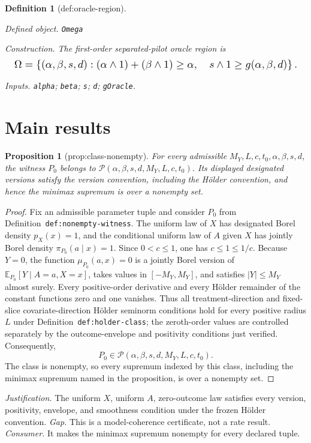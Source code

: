 \documentclass{article}
\newtheorem{definition}{Definition}
\newtheorem{proposition}{Proposition}
\begin{document}
\begin{definition}[def:oracle-region]\label{def:oracle-region}
\par\smallskip\noindent\emph{Defined object.} \texttt{Omega}
\par\smallskip\noindent\emph{Construction.} The first-order separated-pilot oracle region is
\[
\makebox[\linewidth][c]{\resizebox{0.98\linewidth}{!}{\(\displaystyle \Omega
=
\left\{(\alpha,\beta,s,d):
(\alpha\wedge1)+(\beta\wedge1)\ge\alpha,
\quad s\wedge1\ge g(\alpha,\beta,d)
\right\}.\)}}
\]
\par\smallskip\noindent\emph{Inputs.} \texttt{alpha}; \texttt{beta}; \texttt{s}; \texttt{d}; \texttt{gOracle}.
\end{definition}

\section{Main results}

\begin{proposition}[prop:class-nonempty]\label{prop:class-nonempty}
For every admissible \(M_Y,L,c,t_0,\alpha,\beta,s,d\), the witness \(P_0\) belongs to \(\mathcal P(\alpha,\beta,s,d,M_Y,L,c,t_0)\). Its displayed designated versions satisfy the version convention, including the Hölder convention, and hence the minimax supremum is over a nonempty set.
\end{proposition}
\begin{proof}
Fix an admissible parameter tuple and consider \(P_0\) from Definition~\texttt{def:nonempty-witness}. The uniform law of \(X\) has designated Borel density \(p_X(x)=1\), and the conditional uniform law of \(A\) given \(X\) has jointly Borel density \(\pi_{P_0}(a\mid x)=1\). Since \(0<c\le1\), one has \(c\le1\le1/c\). Because \(Y=0\), the function \(\mu_{P_0}(a,x)=0\) is a jointly Borel version of \(\mathbb E_{P_0}[Y\mid A=a,X=x]\), takes values in \([-M_Y,M_Y]\), and satisfies \(\lvert Y\rvert\le M_Y\) almost surely. Every positive-order derivative and every H\"older remainder of the constant functions zero and one vanishes. Thus all treatment-direction and fixed-slice covariate-direction H\"older seminorm conditions hold for every positive radius \(L\) under Definition~\texttt{def:holder-class}; the zeroth-order values are controlled separately by the outcome-envelope and positivity conditions just verified. Consequently,
\[
P_0\in\mathcal P(\alpha,\beta,s,d,M_Y,L,c,t_0).
\]
The class is nonempty, so every supremum indexed by this class, including the minimax supremum named in the proposition, is over a nonempty set.
\end{proof}
\par\smallskip\noindent \textit{Justification.} The uniform \(X\), uniform \(A\), zero-outcome law satisfies every version, positivity, envelope, and smoothness condition under the frozen Hölder convention. \textit{Gap.} This is a model-coherence certificate, not a rate result. \textit{Consumer.} It makes the minimax supremum nonempty for every declared tuple.
\end{document}
